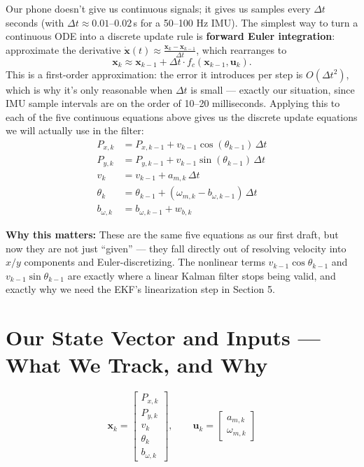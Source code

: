 \documentclass[11pt,a4paper]{article}
\newcommand{\note}[1]{\par\noindent\textbf{Why this matters:} #1\par}
\begin{document}
Our phone doesn't give us continuous signals; it gives us samples every $\Delta t$ seconds (with $\Delta t \approx 0.01$--$0.02\,$s for a 50--100 Hz IMU). The simplest way to turn a continuous ODE into a discrete update rule is \textbf{forward Euler integration}: approximate the derivative $\dot{\mathbf{x}}(t) \approx \frac{\mathbf{x}_k - \mathbf{x}_{k-1}}{\Delta t}$, which rearranges to
\begin{equation}
    \mathbf{x}_k \approx \mathbf{x}_{k-1} + \Delta t \cdot f_c(\mathbf{x}_{k-1}, \mathbf{u}_k).
\end{equation}
This is a first-order approximation: the error it introduces per step is $O(\Delta t^2)$, which is why it's only reasonable when $\Delta t$ is small --- exactly our situation, since IMU sample intervals are on the order of 10--20 milliseconds. Applying this to each of the five continuous equations above gives us the discrete update equations we will actually use in the filter:
\begin{align}
    P_{x,k} &= P_{x,k-1} + v_{k-1} \cos(\theta_{k-1}) \, \Delta t \\
    P_{y,k} &= P_{y,k-1} + v_{k-1} \sin(\theta_{k-1}) \, \Delta t \\
    v_k     &= v_{k-1} + a_{m,k} \, \Delta t \\
    \theta_k &= \theta_{k-1} + (\omega_{m,k} - b_{\omega,k-1}) \, \Delta t \\
    b_{\omega,k} &= b_{\omega,k-1} + w_{b,k}
\end{align}
\note{These are the same five equations as our first draft, but now they are not just ``given'' --- they fall directly out of resolving velocity into $x/y$ components and Euler-discretizing. The nonlinear terms $v_{k-1}\cos\theta_{k-1}$ and $v_{k-1}\sin\theta_{k-1}$ are exactly where a linear Kalman filter stops being valid, and exactly why we need the EKF's linearization step in Section 5.}

\section{Our State Vector and Inputs --- What We Track, and Why}

\begin{equation}
    \mathbf{x}_k = \begin{bmatrix} P_{x,k} \\ P_{y,k} \\ v_k \\ \theta_k \\ b_{\omega,k} \end{bmatrix}, \qquad
    \mathbf{u}_k = \begin{bmatrix} a_{m,k} \\ \omega_{m,k} \end{bmatrix}
\end{equation}
\end{document}
